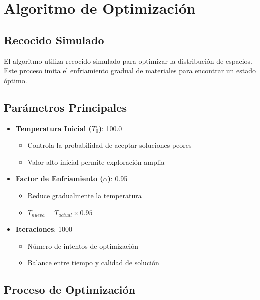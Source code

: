 \documentclass[a4paper,12pt]{article}
\begin{document}
\section{Algoritmo de Optimización}
\subsection{Recocido Simulado}
El algoritmo utiliza recocido simulado para optimizar la distribución de espacios. Este proceso imita el enfriamiento gradual de materiales para encontrar un estado óptimo.

\subsection{Parámetros Principales}
\begin{itemize}
    \item \textbf{Temperatura Inicial ($T_0$)}: 100.0
    \begin{itemize}
        \item Controla la probabilidad de aceptar soluciones peores
        \item Valor alto inicial permite exploración amplia
    \end{itemize}
    
    \item \textbf{Factor de Enfriamiento ($\alpha$)}: 0.95
    \begin{itemize}
        \item Reduce gradualmente la temperatura
        \item $T_{nueva} = T_{actual} \times 0.95$
    \end{itemize}
    
    \item \textbf{Iteraciones}: 1000
    \begin{itemize}
        \item Número de intentos de optimización
        \item Balance entre tiempo y calidad de solución
    \end{itemize}
\end{itemize}

\subsection{Proceso de Optimización}
\end{document}
